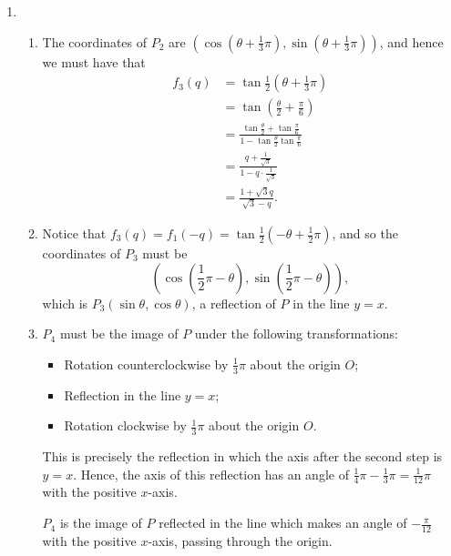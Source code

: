\begin{enumerate}
    \item \begin{enumerate}
              \item The coordinates of \(P_2\) are \(\left(\cos\left(\theta + \frac{1}{3}\pi\right), \sin\left(\theta + \frac{1}{3}\pi\right)\right)\), and hence we must have that
                    \begin{align*}
                        f_3(q) & = \tan \frac{1}{2} \left(\theta + \frac{1}{3}\pi\right)                                           \\
                               & = \tan \left(\frac{\theta}{2} + \frac{\pi}{6}\right)                                              \\
                               & = \frac{\tan \frac{\theta}{2} + \tan \frac{\pi}{6}}{1 - \tan \frac{\theta}{2} \tan \frac{\pi}{6}} \\
                               & = \frac{q + \frac{1}{\sqrt{3}}}{1 - q \cdot \frac{1}{\sqrt{3}}}                                   \\
                               & = \frac{1 + \sqrt{3}q}{\sqrt{3} - q}.
                    \end{align*}

              \item Notice that \(f_3(q) = f_1(-q) = \tan \frac{1}{2} \left(- \theta + \frac{1}{2}\pi\right)\), and so the coordinates of \(P_3\) must be
                    \[
                        \left(\cos \left(\frac{1}{2}\pi - \theta\right), \sin \left(\frac{1}{2}\pi - \theta\right)\right),
                    \]
                    which is \(P_3 (\sin \theta, \cos \theta)\), a reflection of \(P\) in the line \(y = x\).

              \item \(P_4\) must be the image of \(P\) under the following transformations:
                    \begin{itemize}
                        \item Rotation counterclockwise by \(\frac{1}{3}\pi\) about the origin \(O\);
                        \item Reflection in the line \(y = x\);
                        \item Rotation clockwise by \(\frac{1}{3}\pi\) about the origin \(O\).
                    \end{itemize}

                    This is precisely the reflection in which the axis after the second step is \(y = x\). Hence, the axis of this reflection has an angle of \(\frac{1}{4} \pi - \frac{1}{3}\pi = \frac{1}{12}\pi\) with the positive \(x\)-axis.

                    \(P_4\) is the image of \(P\) reflected in the line which makes an angle of \(-\frac{\pi}{12}\) with the positive \(x\)-axis, passing through the origin.
          \end{enumerate}
\end{enumerate}
